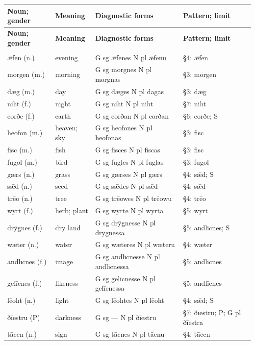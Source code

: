 \begin{longtable}{@{}>{\raggedright\arraybackslash}p{24.0mm}>{\raggedright\arraybackslash}p{39.0mm}>{\raggedright\arraybackslash}p{28.0mm}>{\raggedright\arraybackslash}p{24.564mm}@{}}
\toprule
\textbf{Noun; gender} & \textbf{Meaning} & \textbf{Diagnostic forms} & \textbf{Pattern; limit} \\
\midrule
\endfirsthead
\toprule
\textbf{Noun; gender} & \textbf{Meaning} & \textbf{Diagnostic forms} & \textbf{Pattern; limit} \\
\midrule
\endhead
\midrule
\multicolumn{4}{r}{\footnotesize Continued on the following page.}\\
\endfoot
\bottomrule
\endlastfoot
 ǣfen (n.) & evening & G sg ǣfenes N pl ǣfenu & §4: ǣfen \\
 morgen (m.) & morning & G sg morgnes N pl morgnas & §3: morgen \\
 dæg (m.) & day & G sg dæges N pl dagas & §3: dæg \\
 niht (f.) & night & G sg niht N pl niht & §7: niht \\
 eorðe (f.) & earth & G sg eorðan N pl eorðan & §6: eorðe; S \\
 heofon (m.) & heaven; sky & G sg heofones N pl heofonas & §3: fisc \\
 fisc (m.) & fish & G sg fisces N pl fiscas & §3: fisc \\
 fugol (m.) & bird & G sg fugles N pl fuglas & §3: fugol \\
 gærs (n.) & grass & G sg gærses N pl gærs & §4: sǣd; S \\
 sǣd (n.) & seed & G sg sǣdes N pl sǣd & §4: sǣd \\
 trēo (n.) & tree & G sg trēowes N pl trēowu & §4: trēo \\
 wyrt (f.) & herb; plant & G sg wyrte N pl wyrta & §5: wyrt \\
 drȳgnes (f.) & dry land & G sg drȳgnesse N pl drȳgnessa & §5: andlīcnes; S \\
 wæter (n.) & water & G sg wæteres N pl wæteru & §4: wæter \\
 andlīcnes (f.) & image & G sg andlīcnesse N pl andlīcnessa & §5: andlīcnes \\
 gelīcnes (f.) & likeness & G sg gelīcnesse N pl gelīcnessa & §5: andlīcnes \\
 lēoht (n.) & light & G sg lēohtes N pl lēoht & §4: sǣd; S \\
 ðīestru (P) & darkness & G sg — N pl ðīestru & §7: ðīestru; P; G pl ðīestra \\
 tācen (n.) & sign & G sg tācnes N pl tācnu & §4: tācen \\

\end{longtable}
